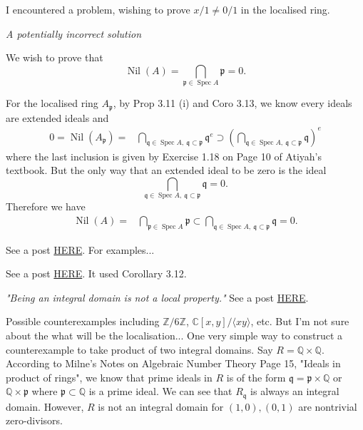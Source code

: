 I encountered a problem, wishing to prove $x/1\neq 0/1$ in the localised ring.


\textit{A potentially incorrect solution}

We wish to prove that 
$$\operatorname{Nil}(A)=\bigcap_{\mathfrak p\in\operatorname{Spec}A}\mathfrak p=0.$$

For the localised ring $A_{\mathfrak p}$, by Prop 3.11 (i) and Coro 3.13, we know every ideals are extended ideals and 
\begin{align*}
	0=\operatorname{Nil}(A_{\mathfrak p}) =& \bigcap_{\mathfrak q\in\operatorname{Spec}A,~ \mathfrak q\subset \mathfrak p} \mathfrak q^{e}\supset \left(\bigcap_{\mathfrak q\in\operatorname{Spec}A,~ \mathfrak q\subset \mathfrak p} \mathfrak q\right)^e
\end{align*}where the last inclusion is given by Exercise 1.18 on Page 10 of Atiyah's textbook. But the only way that an extended ideal to be zero is the ideal 
$$\bigcap_{\mathfrak q\in\operatorname{Spec}A,~ \mathfrak q\subset \mathfrak p} \mathfrak q=0.$$ Therefore we have 
\begin{align*}
	\operatorname{Nil}(A) =& \bigcap_{\mathfrak p\in\operatorname{Spec}A}\mathfrak p\subset \bigcap_{\mathfrak q\in\operatorname{Spec}A,~ \mathfrak q\subset \mathfrak p} \mathfrak q=0.
\end{align*}

See a post \href{https://math.stackexchange.com/questions/2095939/proof-check-being-reduced-is-a-local-property-atiyah-macdonald-3-5?rq=1}{HERE}. For examples...

See a post \href{https://math.stackexchange.com/questions/2095939/proof-check-being-reduced-is-a-local-property-atiyah-macdonald-3-5?rq=1}{HERE}. It used Corollary 3.12.

\textit{"Being an integral domain is not a local property."} See a post \href{https://math.stackexchange.com/questions/685844/is-being-an-integral-domain-a-local-property}{HERE}.

Possible counterexamples including $\mathbb Z/6\mathbb Z$, $\mathbb C[x,y]/\langle xy\rangle$, etc. 
But I'm not sure about the what will be the localisation... 
One very simple way to construct a counterexample to take product of two integral domains. 
Say $R=\mathbb Q\times\mathbb Q$. According to Milne's Notes on Algebraic Number Theory Page 15, "Ideals in product of rings", we know that prime ideals in $R$ is of the form $\mathfrak q=\mathfrak p\times \mathbb Q$ or $\mathbb Q\times\mathfrak p$ where $\mathfrak p\subset\mathbb Q$ is a prime ideal. We can see that $R_{\mathfrak q}$ is always an integral domain. However, $R$ is not an integral domain for $(1,0),(0,1)$ are nontrivial zero-divisors.

